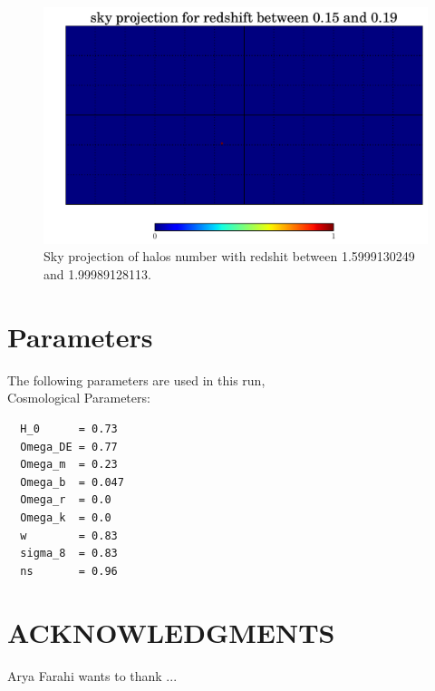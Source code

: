 \documentclass[12pt]{article}
\begin{document}
\begin{figure}
  \centering
  \includegraphics[width=12cm]{./Output/plots/HEALPix/sky_projection_HEALPix_Count_32_5.pdf}
  \caption{Sky projection of halos number with redshit between 1.5999130249 and 1.99989128113.}
  \label{fig:S-ProjCount-5}
\end{figure}

 
\section{Parameters}

The following parameters are used in this run, \\

Cosmological Parameters:
\begin{verbatim}
  H_0      = 0.73
  Omega_DE = 0.77
  Omega_m  = 0.23
  Omega_b  = 0.047
  Omega_r  = 0.0
  Omega_k  = 0.0
  w        = 0.83
  sigma_8  = 0.83
  ns       = 0.96
\end{verbatim}


\section*{ACKNOWLEDGMENTS}
 Arya Farahi wants to thank ...
 
\end{document}
